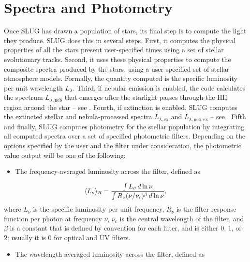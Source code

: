 \documentclass[letterpaper,10pt,english]{sphinxmanual}
\begin{document}
\section{Spectra and Photometry}
\label{intro:ssec-spec-phot}\label{intro:spectra-and-photometry}
Once SLUG has drawn a population of stars, its final step is to compute the light they produce. SLUG does this in several steps. First, it computes the physical properties of all the stars present user-specified times using a set of stellar evolutionary tracks. Second, it uses these physical properties to compute the composite spectra produced by the stars, using a user-specified set of stellar atmosphere models. Formally, the quantity computed is the specific luminosity per unit wavelength \(L_\lambda\). Third, if nebular emission is enabled, the code calculates the spectrum \(L_{\lambda,\mathrm{neb}}\) that emerges after the starlight passes through the HII region aruond the star -- see {\hyperref[intro:ssec-nebula]{\emph{}}}. Fourth, if extinction is enabled, SLUG computes the extincted stellar and nebula-processed spectra \(L_{\lambda,\mathrm{ex}}\) and \(L_{\lambda,\mathrm{neb,ex}}\) -- see {\hyperref[intro:ssec-extinction]{\emph{}}}. Fifth and finally, SLUG computes photometry for the stellar population by integrating all computed spectra over a set of specified photometric filters. Depending on the options specified by the user and the filter under consideration, the photometric value output will be one of the following:
\begin{itemize}
\item {} 
The frequency-averaged luminosity across the filter, defined as

\end{itemize}
\begin{gather}
\begin{split}\langle L_\nu\rangle_R = \frac{\int L_\nu \, d\ln\nu}{\int R_\nu (\nu/\nu_c)^\beta \, d\ln\nu},\end{split}\notag
\end{gather}
where \(L_\nu\) is the specific luminosity per unit frequency, \(R_\nu\) is the filter response function per photon at frequency \(\nu\), \(\nu_c\) is the central wavelength of the filter, and \(\beta\) is a constant that is defined by convention for each filter, and is either 0, 1, or 2; usually it is 0 for optical and UV filters.
\begin{itemize}
\item {} 
The wavelength-averaged luminosity across the filter, defined as

\end{itemize}
\end{document}
